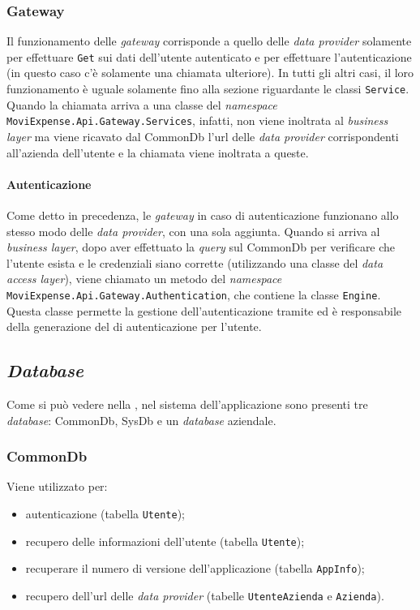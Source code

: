 \subsubsection{Gateway}

Il funzionamento delle  \textit{gateway} corrisponde a quello delle \textit{data provider} solamente per effettuare \texttt{Get} sui dati dell'utente autenticato e per effettuare l'autenticazione (in questo caso c'è solamente una chiamata ulteriore). In tutti gli altri casi, il loro funzionamento è uguale solamente fino alla sezione riguardante le classi \texttt{Service}. Quando la chiamata arriva a una classe del \textit{namespace} \texttt{MoviExpense.Api.Gateway.Services}, infatti, non viene inoltrata al \textit{business layer} ma viene ricavato dal CommonDb l'url delle  \textit{data provider} corrispondenti all'azienda dell'utente e la chiamata viene inoltrata a queste.

\paragraph{Autenticazione} Come detto in precedenza, le  \textit{gateway} in caso di autenticazione funzionano allo stesso modo delle \textit{data provider}, con una sola aggiunta. Quando si arriva al \textit{business layer}, dopo aver effettuato la \textit{query} sul CommonDb per verificare che l'utente esista e le credenziali siano corrette (utilizzando una classe del \textit{data access layer}), viene chiamato un metodo del \textit{namespace} \texttt{MoviExpense.Api.Gateway.Authentication}, che contiene la classe \texttt{Engine}. Questa classe permette la gestione dell'autenticazione tramite  ed è responsabile della generazione del  di autenticazione per l'utente.


\subsection{\textit{Database}}

Come si può vedere nella , nel sistema dell'applicazione sono presenti tre \textit{database}: CommonDb, SysDb e un \textit{database} aziendale.

\subsubsection{CommonDb}

Viene utilizzato per:
\begin{itemize}
    \item autenticazione (tabella \texttt{Utente});
    \item recupero delle informazioni dell'utente (tabella \texttt{Utente});
    \item recuperare il numero di versione dell'applicazione (tabella \texttt{AppInfo});
    \item recupero dell'url delle  \textit{data provider} (tabelle \texttt{UtenteAzienda} e \texttt{Azienda}).
\end{itemize}

